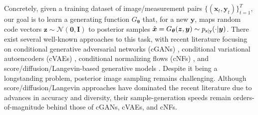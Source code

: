 \documentclass{article}
\theoremstyle{plain}
\theoremstyle{definition}
\theoremstyle{remark}
\newcommand{\hvec}[1]{\ensuremath{\Hat{\boldsymbol{#1}}}}
\renewcommand{\vec}[1]{\ensuremath{\boldsymbol{#1}}}
\newcommand{\mc}[1]{\ensuremath{\mathcal{#1}}}
\newcommand{\textr}[1]{\textcolor{red}{#1}}
\newcommand{\pxy}{p_{\mathsf{x,y}}}
\newcommand{\pxgy}{p_{\mathsf{x}|\mathsf{y}}}
\begin{document}
Concretely, given a training dataset of image/measurement pairs $\{(\vec{x}_t,\vec{y}_t)\}_{t=1}^T$, 
our goal is to learn a generating function $G_{\vec{\theta}}$ that, for a new $\vec{y}$, maps random code vectors $\vec{z}\sim\mc{N}(\vec{0},\vec{I})$ to posterior samples $\hvec{x}=G_{\vec{\theta}}(\vec{z},\vec{y})\sim\pxgy(\cdot|\vec{y})$.
%
%
There exist several well-known approaches to this task, with recent literature focusing on
conditional generative adversarial networks (cGANs) 
\cite{Isola:CVPR:17,Adler:18,Zhao:ICLR:21,Zhao:MIA:18},
conditional variational autoencoders (cVAEs) 
\cite{Edupuganti:TMI:20,Tonolini:JMLR:20,Sohn:NIPS:15},
conditional normalizing flows (cNFs) 
\cite{Ardizzone:19,Winkler:19,Sun:AAAI:21},
and score/diffusion/Langevin-based generative models 
\cite{Welling:ICML:11,Song:NIPS:20,Jalal:NIPS:21,Song:ICLR:21,Song:ICLR:22}.  
Despite it being a longstanding problem, posterior image sampling remains challenging.
Although score/diffusion/Langevin approaches have dominated the recent literature due to advances in accuracy and diversity, their sample-generation speeds remain orders-of-magnitude behind those of cGANs, cVAEs, and cNFs.
\end{document}
